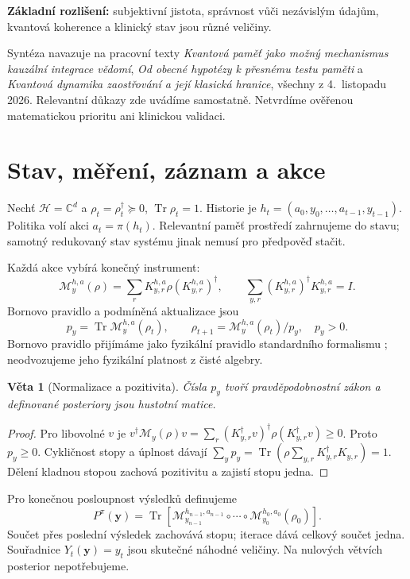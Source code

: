 \documentclass[11pt,a4paper]{article}
\newtheorem{theorem}{Věta}
\DeclareMathOperator{\Tr}{Tr}
\begin{document}
\textbf{Základní rozlišení:} subjektivní jistota, správnost vůči nezávislým údajům, kvantová koherence a klinický stav jsou různé veličiny.

Syntéza navazuje na pracovní texty \emph{Kvantová paměť jako možný mechanismus kauzální integrace vědomí}, \emph{Od obecné hypotézy k přesnému testu paměti} a \emph{Kvantová dynamika zaostřování a její klasická hranice}, všechny z 4.~listopadu 2026. Relevantní důkazy zde uvádíme samostatně. Netvrdíme ověřenou matematickou prioritu ani klinickou validaci.

\newpage
\section{Stav, měření, záznam a akce}
Nechť $\mathcal H=\mathbb C^d$ a $\rho_t=\rho_t^\dagger\succeq0$,
$\Tr\rho_t=1$. Historie je $h_t=(a_0,y_0,\ldots,a_{t-1},y_{t-1})$.
Politika volí akci $a_t=\pi(h_t)$. Relevantní paměť prostředí zahrnujeme do stavu; samotný redukovaný stav systému jinak nemusí pro předpověď stačit.

Každá akce vybírá konečný instrument:
\[
\mathcal M_y^{h,a}(\rho)=\sum_r K_{y,r}^{h,a}\rho(K_{y,r}^{h,a})^\dagger,
\qquad
\sum_{y,r}(K_{y,r}^{h,a})^\dagger K_{y,r}^{h,a}=I.
\]
Bornovo pravidlo a podmíněná aktualizace jsou
\[
p_y=\Tr\mathcal M_y^{h,a}(\rho_t),\qquad
\rho_{t+1}=\mathcal M_y^{h,a}(\rho_t)/p_y,\quad p_y>0.
\]
Bornovo pravidlo přijímáme jako fyzikální pravidlo standardního formalismu \cite{ibm}; neodvozujeme jeho fyzikální platnost z čisté algebry.

\begin{theorem}[Normalizace a pozitivita]
Čísla $p_y$ tvoří pravděpodobnostní zákon a definované posteriory jsou hustotní matice.
\end{theorem}
\begin{proof}
Pro libovolné $v$ je
$v^\dagger\mathcal M_y(\rho)v=\sum_r(K_{y,r}^\dagger v)^\dagger\rho(K_{y,r}^\dagger v)\geq0$.
Proto $p_y\geq0$. Cykličnost stopy a úplnost dávají
$\sum_y p_y=\Tr(\rho\sum_{y,r}K_{y,r}^\dagger K_{y,r})=1$.
Dělení kladnou stopou zachová pozitivitu a zajistí stopu jedna.
\end{proof}
Pro konečnou posloupnost výsledků definujeme
\[
P^\pi(\boldsymbol y)=
\Tr\!\left[\mathcal M_{y_{n-1}}^{h_{n-1},a_{n-1}}\circ\cdots
\circ\mathcal M_{y_0}^{h_0,a_0}(\rho_0)\right].
\]
Součet přes poslední výsledek zachovává stopu; iterace dává celkový součet jedna. Souřadnice $Y_t(\boldsymbol y)=y_t$ jsou skutečné náhodné veličiny. Na nulových větvích posterior nepotřebujeme.
\end{document}

